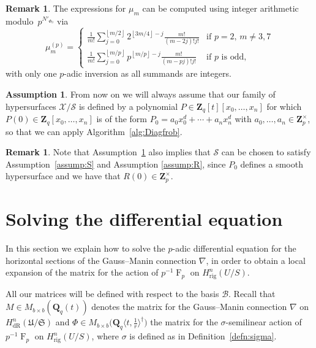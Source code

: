 \documentclass[a4paper,11pt]{article}
\numberwithin{equation}{section}
\providecommand{\floor}[1]{\left\lfloor#1\right\rfloor}   %
\newcommand{\ZZ}{\mathbf{Z}} %
\newcommand{\QQ}{\mathbf{Q}} %
\DeclareMathOperator{\Frob}{F}           %
\providecommand{\HdR}{H_{\text{dR}}}    %
\providecommand{\Hrig}{H_{\text{rig}}}  %
\providecommand{\cB}{\mathcal{B}} %
\theoremstyle{definition}
\newtheorem{rem}[thm]{Remark}
\newtheorem{assump}[thm]{Assumption}
\begin{document}
\begin{rem} \label{rem:mup}
The expressions for $\mu_m$ can be computed using integer arithmetic 
modulo~$p^{N'_{\Phi_0}}$ via 
\begin{equation*}
\mu_m^{(p)} = \begin{cases}
\frac{1}{m!} \sum_{j=0}^{\floor{m/2}} 2^{\floor{3m/4} - j} \frac{m!}{(m-2j)! j!}
    & \text{if $p = 2$, $m \neq 3, 7$} \\
\frac{1}{m!} \sum_{j=0}^{\floor{m/p}} p^{\floor{m/p} - j} \frac{m!}{(m-pj)! j!}
    & \text{if $p$ is odd},
\end{cases}
\end{equation*}
with only one $p$-adic inversion as all summands are integers. 
\end{rem}

\begin{assump} \label{assump:diag}
From now on we will always assume that our family of 
hypersurfaces $\mathcal{X}/\mathcal{S}$ is defined by a 
polynomial $P \in \ZZ_q[t][x_0,\dotsc,x_n]$ for which 
$P(0) \in \ZZ_q[x_0,\dotsc,x_n]$ is of the form 
$P_0=a_0 x_0^d + \dotsb + a_n x_n^d$ with $a_0,\dotsc,a_n \in \ZZ_p^{\times}$, 
so that we can apply Algorithm~\ref{alg:Diagfrob}. 
\end{assump}

\begin{rem}
Note that Assumption~\ref{assump:diag} 
also implies that $\mathcal{S}$ can be chosen to satisfy Assumption~\ref{assump:S} 
and Assumption \ref{assump:R}, since $P_0$ defines a smooth hypersurface and 
we have that $R(0) \in \ZZ_p^{\times}$. 
\end{rem}


\section{Solving the differential equation}
\label{sec:DifferentialSystem}

In this section we explain how to solve the $p$-adic differential 
equation for the horizontal sections of the Gauss--Manin 
connection $\nabla$, in order to obtain a local expansion of the 
matrix for the action of $p^{-1} \Frob_p$ on $\Hrig^{n}(U/S)$.  

All our matrices will be defined with respect to the basis $\cB$. Recall 
that $M \in M_{b \times b}(\QQ_q(t))$ denotes 
the matrix for the Gauss--Manin connection $\nabla$ on 
$\HdR^n(\mathfrak{U}/\mathfrak{S})$ and 
$\Phi \in M_{b \times b} \bigl(\QQ_q \langle t,\frac{1}{r} \rangle^{\dag} \bigr)$ 
the matrix for the $\sigma$-semilinear action of~$p^{-1} \Frob_p$ 
on $\Hrig^{n}(U/S)$, where $\sigma$ is defined as 
in Definition~\ref{defn:sigma}.
\end{document}
